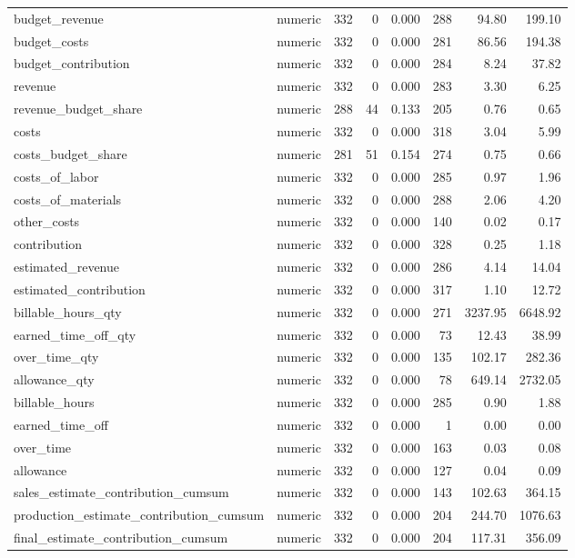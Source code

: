 \begin{landscape}
\begin{longtable}[t]{llrrrrrr}
budget\_revenue & numeric & 332 & 0 & 0.000 & 288 & 94.80 & 199.10\\
budget\_costs & numeric & 332 & 0 & 0.000 & 281 & 86.56 & 194.38\\
budget\_contribution & numeric & 332 & 0 & 0.000 & 284 & 8.24 & 37.82\\
revenue & numeric & 332 & 0 & 0.000 & 283 & 3.30 & 6.25\\
revenue\_budget\_share & numeric & 288 & 44 & 0.133 & 205 & 0.76 & 0.65\\
costs & numeric & 332 & 0 & 0.000 & 318 & 3.04 & 5.99\\
costs\_budget\_share & numeric & 281 & 51 & 0.154 & 274 & 0.75 & 0.66\\
costs\_of\_labor & numeric & 332 & 0 & 0.000 & 285 & 0.97 & 1.96\\
costs\_of\_materials & numeric & 332 & 0 & 0.000 & 288 & 2.06 & 4.20\\
other\_costs & numeric & 332 & 0 & 0.000 & 140 & 0.02 & 0.17\\
contribution & numeric & 332 & 0 & 0.000 & 328 & 0.25 & 1.18\\
estimated\_revenue & numeric & 332 & 0 & 0.000 & 286 & 4.14 & 14.04\\
estimated\_contribution & numeric & 332 & 0 & 0.000 & 317 & 1.10 & 12.72\\
billable\_hours\_qty & numeric & 332 & 0 & 0.000 & 271 & 3237.95 & 6648.92\\
earned\_time\_off\_qty & numeric & 332 & 0 & 0.000 & 73 & 12.43 & 38.99\\
over\_time\_qty & numeric & 332 & 0 & 0.000 & 135 & 102.17 & 282.36\\
allowance\_qty & numeric & 332 & 0 & 0.000 & 78 & 649.14 & 2732.05\\
billable\_hours & numeric & 332 & 0 & 0.000 & 285 & 0.90 & 1.88\\
earned\_time\_off & numeric & 332 & 0 & 0.000 & 1 & 0.00 & 0.00\\
over\_time & numeric & 332 & 0 & 0.000 & 163 & 0.03 & 0.08\\
allowance & numeric & 332 & 0 & 0.000 & 127 & 0.04 & 0.09\\
sales\_estimate\_contribution\_cumsum & numeric & 332 & 0 & 0.000 & 143 & 102.63 & 364.15\\
production\_estimate\_contribution\_cumsum & numeric & 332 & 0 & 0.000 & 204 & 244.70 & 1076.63\\
final\_estimate\_contribution\_cumsum & numeric & 332 & 0 & 0.000 & 204 & 117.31 & 356.09\\

\end{longtable}
\end{landscape}
